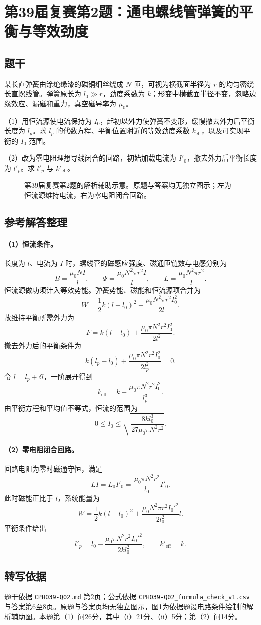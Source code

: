 \section{第39届复赛第2题：通电螺线管弹簧的平衡与等效劲度}

\subsection{题干}
某长直弹簧由涂绝缘漆的磷铜细丝绕成 $N$ 匝，可视为横截面半径为 $r$ 的均匀密绕长直螺线管。弹簧原长为 $l_0\gg r$，劲度系数为 $k$；形变中横截面半径不变，忽略边缘效应、漏磁和重力，真空磁导率为 $\mu_0$。

（1）用恒流源使电流保持为 $I_0$，起初以外力使弹簧不变形，缓慢撤去外力后平衡长度为 $l_p$。求 $l_p$ 的代数方程、平衡位置附近的等效劲度系数 $k_{\mathrm{eff}}$，以及可实现平衡的 $I_0$ 范围。

（2）改为零电阻理想导线闭合的回路，初始加载电流为 $I'_0$，撤去外力后平衡长度为 $l'_p$。求 $l'_p$ 与 $k'_{\mathrm{eff}}$。

\begin{figure}[htbp]
  \centering
  
  \caption{第39届复赛第2题的解析辅助示意。原题与答案均无独立图示；左为恒流源维持电流，右为零电阻闭合回路。}
  \label{fig:cpho39q02}
\end{figure}

\subsection{参考解答整理}
\paragraph{（1）恒流条件。}
长度为 $l$、电流为 $I$ 时，螺线管的磁感应强度、磁通匝链数与电感分别为
\[
B=\frac{\mu_0NI}{l},\qquad
\Psi=\frac{\mu_0N^2\pi r^2I}{l},\qquad
L=\frac{\mu_0N^2\pi r^2}{l}.
\]
恒流源做功须计入等效势能。弹簧势能、磁能和恒流源项合并为
\[
W=\frac12k(l-l_0)^2-\frac{\mu_0N^2\pi r^2I_0^2}{2l}.
\]
故维持平衡所需外力为
\[
F=k(l-l_0)+\frac{\mu_0\pi N^2r^2I_0^2}{2l^2}.
\]
撤去外力后的平衡条件为
\[
\boxed{k(l_p-l_0)+\frac{\mu_0\pi N^2r^2I_0^2}{2l_p^2}=0.}
\]
令 $l=l_p+\delta l$，一阶展开得到
\[
\boxed{k_{\mathrm{eff}}=k-\frac{\mu_0\pi N^2r^2I_0^2}{l_p^3}.}
\]
由平衡方程和平均值不等式，恒流的范围为
\[
\boxed{0\le I_0\le\sqrt{\frac{8kl_0^3}{27\mu_0\pi N^2r^2}}.}
\]

\paragraph{（2）零电阻闭合回路。}
回路电阻为零时磁通守恒，满足
\[
LI=L_0I'_0=\frac{\mu_0\pi N^2r^2}{l_0}I'_0.
\]
此时磁能正比于 $l$，系统能量为
\[
W=\frac12k(l-l_0)^2+\frac{\mu_0N^2\pi r^2I_0'^2}{2l_0^2}l.
\]
平衡条件给出
\[
\boxed{l'_p=l_0-\frac{\mu_0\pi N^2r^2I_0'^2}{2kl_0^2},\qquad k'_{\mathrm{eff}}=k.}
\]

\subsection{转写依据}
题干依据 \texttt{CPHO39-Q02.md} 第2页；公式依据 \texttt{CPHO39-Q02\_formula\_check\_v1.csv} 与答案第6至8页。原题与答案页均无独立图示，图\ref{fig:cpho39q02}为依据题设电路条件绘制的解析辅助图。本题第（1）问26分，其中（i）21分、（ii）5分；第（2）问14分。
